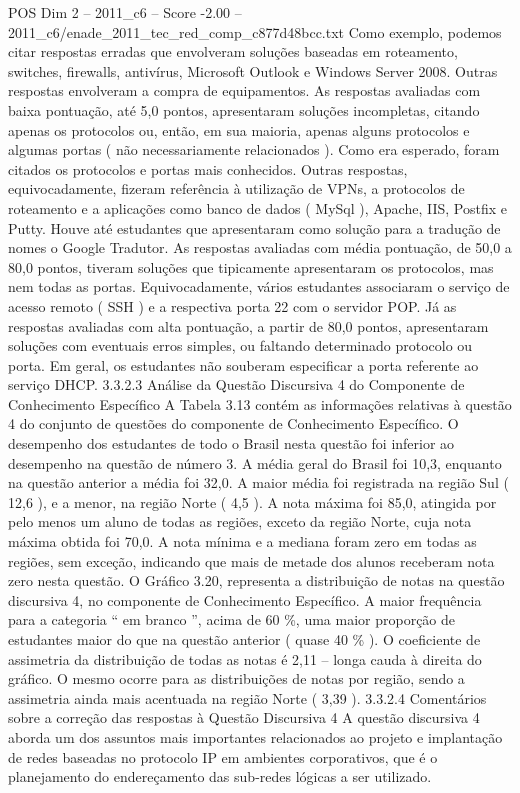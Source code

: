 \begin{textsample}{POS Dim 2 – 2011\_c6 – Score -2.00 – 2011\_c6/enade\_2011\_tec\_red\_comp\_c877d48bcc.txt}
Como exemplo, podemos citar respostas erradas que envolveram soluções baseadas em roteamento, switches, firewalls, antivírus, Microsoft Outlook e Windows Server 2008.
Outras respostas envolveram a compra de equipamentos.
As respostas avaliadas com baixa pontuação, até 5,0 pontos, apresentaram soluções incompletas, citando apenas os protocolos ou, então, em sua maioria, apenas alguns protocolos e algumas portas ( não necessariamente relacionados ).
Como era esperado, foram citados os protocolos e portas mais conhecidos.
Outras respostas, equivocadamente, fizeram referência à utilização de VPNs, a protocolos de roteamento e a aplicações como banco de dados ( MySql ), Apache, IIS, Postfix e Putty.
Houve até estudantes que apresentaram como solução para a tradução de nomes o Google Tradutor.
As respostas avaliadas com média pontuação, de 50,0 a 80,0 pontos, tiveram soluções que tipicamente apresentaram os protocolos, mas nem todas as portas.
Equivocadamente, vários estudantes associaram o serviço de acesso remoto ( SSH ) e a respectiva porta 22 com o servidor POP.
Já as respostas avaliadas com alta pontuação, a partir de 80,0 pontos, apresentaram soluções com eventuais erros simples, ou faltando determinado protocolo ou porta.
Em geral, os estudantes não souberam especificar a porta referente ao serviço DHCP. 3.3.2.3 Análise da Questão Discursiva 4 do Componente de Conhecimento Específico A Tabela 3.13 contém as informações relativas à questão 4 do conjunto de questões do componente de Conhecimento Específico.
O desempenho dos estudantes de todo o Brasil nesta questão foi inferior ao desempenho na questão de número 3.
A média geral do Brasil foi 10,3, enquanto na questão anterior a média foi 32,0.
A maior média foi registrada na região Sul ( 12,6 ), e a menor, na região Norte ( 4,5 ).
A nota máxima foi 85,0, atingida por pelo menos um aluno de todas as regiões, exceto da região Norte, cuja nota máxima obtida foi 70,0.
A nota mínima e a mediana foram zero em todas as regiões, sem exceção, indicando que mais de metade dos alunos receberam nota zero nesta questão.
O Gráfico 3.20, representa a distribuição de notas na questão discursiva 4, no componente de Conhecimento Específico.
A maior frequência para a categoria “ em branco ”, acima de 60 \%, uma maior proporção de estudantes maior do que na questão anterior ( quase 40 \% ).
O coeficiente de assimetria da distribuição de todas as notas é 2,11 – longa cauda à direita do gráfico.
O mesmo ocorre para as distribuições de notas por região, sendo a assimetria ainda mais acentuada na região Norte ( 3,39 ). 3.3.2.4 Comentários sobre a correção das respostas à Questão Discursiva 4 A questão discursiva 4 aborda um dos assuntos mais importantes relacionados ao projeto e implantação de redes baseadas no protocolo IP em ambientes corporativos, que é o planejamento do endereçamento das sub-redes lógicas a ser utilizado.

\end{textsample}
